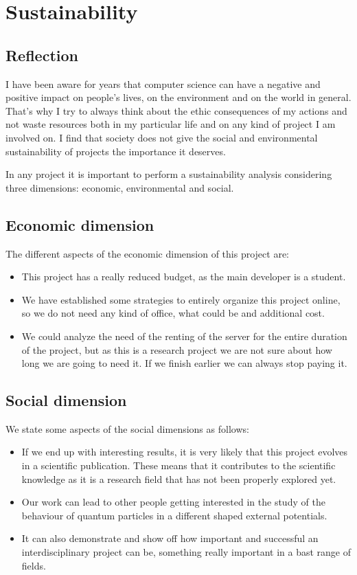 \documentclass{article}
\begin{document}
\section{Sustainability}
\subsection{Reflection}
I have been aware for years that computer science can have a negative and positive impact on people's lives, on the environment and on the world in general. That's why I try to always think about the ethic consequences of my actions and not waste resources both in my particular life and on any kind of project I am involved on. I find that society does not give the social and environmental sustainability of projects the importance it deserves. 

In any project it is important to perform a sustainability analysis considering three dimensions: economic, environmental and social. 

\subsection{Economic dimension}
The different aspects of the economic dimension of this project are:
\begin{itemize}
    \item This project has a really reduced budget, as the main developer is a student. 
    \item We have established some strategies to entirely organize this project online, so we do not need any kind of office, what could be and additional cost.
    \item We could analyze the need of the renting of the server for the entire duration of the project, but as this is a research project we are not sure about how long we are going to need it. If we finish earlier we can always stop paying it.
    
\end{itemize}

\subsection{Social dimension}
We state some aspects of the social dimensions as follows: 
\begin{itemize}
    \item If we end up with interesting results, it is very likely that this project evolves in a scientific publication. These means that it contributes to the scientific knowledge as it is a research field that has not been properly explored yet.
    \item Our work can lead to other people getting interested in the study of the behaviour of quantum particles in a different shaped external potentials.
    \item It can also demonstrate and show off how important and successful an interdisciplinary project can be, something really important in a bast range of fields.
    
\end{itemize}
\end{document}
